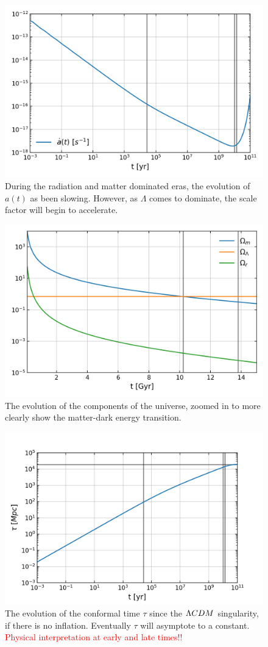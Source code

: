 \begin{figure}[!pth]
\centering     %
    \includegraphics[width=.75\columnwidth]{plots/lcdm_adot.png}
\caption{
    During the radiation and matter dominated eras, the evolution of
    $a(t)$ as been slowing. However, as $\Lambda$ comes to dominate,
    the scale factor will begin to accelerate.
}\label{fig:lcdm_adot}
\end{figure}
\begin{figure}[!pth]
\centering     %
    \includegraphics[width=.75\columnwidth]{plots/lcdm_components_linear.png}
\caption{
    The evolution of the components of the universe, zoomed in to more clearly
    show the matter-dark energy transition.
}\label{fig:lcdm_components_linear}
\end{figure}
\begin{figure}[!pth]
\centering     %
    \includegraphics[width=.75\columnwidth]{plots/lcdm_tau.png}
\caption{
    The evolution of the conformal time $\tau$ since the $\Lambda CDM$ singularity,
    if there is no inflation. Eventually $\tau$ will asymptote to a constant.
    \textcolor{red}{Physical interpretation at early and late times!!}
}\label{fig:lcdm_tau}
\end{figure}
